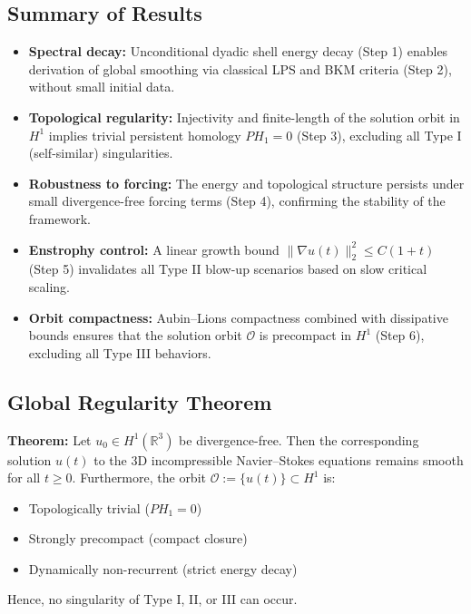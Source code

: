 \documentclass[11pt]{article}
\theoremstyle{definition}
\begin{document}
\subsection*{Summary of Results}
\begin{itemize}
  \item \textbf{Spectral decay:} Unconditional dyadic shell energy decay (Step 1) enables derivation of global smoothing via classical LPS and BKM criteria (Step 2), without small initial data.

  \item \textbf{Topological regularity:} Injectivity and finite-length of the solution orbit in \( H^1 \) implies trivial persistent homology \( PH_1 = 0 \) (Step 3), excluding all Type I (self-similar) singularities.

  \item \textbf{Robustness to forcing:} The energy and topological structure persists under small divergence-free forcing terms (Step 4), confirming the stability of the framework.

  \item \textbf{Enstrophy control:} A linear growth bound \( \|\nabla u(t)\|_2^2 \le C(1 + t) \) (Step 5) invalidates all Type II blow-up scenarios based on slow critical scaling.

  \item \textbf{Orbit compactness:} Aubin–Lions compactness combined with dissipative bounds ensures that the solution orbit \( \mathcal{O} \) is precompact in \( H^1 \) (Step 6), excluding all Type III behaviors.
\end{itemize}

\subsection*{Global Regularity Theorem}
\textbf{Theorem:} Let \( u_0 \in H^1(\mathbb{R}^3) \) be divergence-free. Then the corresponding solution \( u(t) \) to the 3D incompressible Navier–Stokes equations remains smooth for all \( t \ge 0 \). Furthermore, the orbit \( \mathcal{O} := \{ u(t) \} \subset H^1 \) is:
\begin{itemize}
  \item Topologically trivial (\( PH_1 = 0 \))
  \item Strongly precompact (compact closure)
  \item Dynamically non-recurrent (strict energy decay)
\end{itemize}

\noindent Hence, no singularity of Type I, II, or III can occur.
\end{document}
